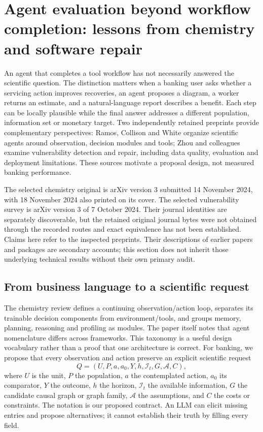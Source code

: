 \section[Agent evaluation beyond workflow completion]{Agent evaluation beyond workflow completion: lessons from chemistry and software repair}
\label{sec:exec25-cow}

An agent that completes a tool workflow has not necessarily answered the scientific question. The distinction matters when a banking user asks whether a servicing action improves recoveries, an agent proposes a diagram, a worker returns an estimate, and a natural-language report describes a benefit. Each step can be locally plausible while the final answer addresses a different population, information set or monetary target. Two independently retained preprints provide complementary perspectives: Ramos, Collison and White organize scientific agents around observation, decision modules and tools; Zhou and colleagues examine vulnerability detection and repair, including data quality, evaluation and deployment limitations. These sources motivate a proposal design, not measured banking performance.\citep{exec25_cow_chemistry,exec25_cow_vulnerability}

The selected chemistry original is arXiv version 3 submitted 14 November 2024, with 18 November 2024 also printed on its cover. The selected vulnerability survey is arXiv version 3 of 7 October 2024. Their journal identities are separately discoverable, but the retained original journal bytes were not obtained through the recorded routes and exact equivalence has not been established. Claims here refer to the inspected preprints. Their descriptions of earlier papers and packages are secondary accounts; this section does not inherit those underlying technical results without their own primary audit.\citep{exec25_cow_chemistry,exec25_cow_vulnerability}

\subsection{From business language to a scientific request}

The chemistry review defines a continuing observation/action loop, separates its trainable decision components from environment/tools, and groups memory, planning, reasoning and profiling as modules. The paper itself notes that agent nomenclature differs across frameworks. This taxonomy is a useful design vocabulary rather than a proof that one architecture is correct. For banking, we propose that every observation and action preserve an explicit scientific request
\[
 Q=(U,P,a,a_0,Y,h,\mathcal I_t,G,\mathcal A,C),
\]
where $U$ is the unit, $P$ the population, $a$ the contemplated action, $a_0$ its comparator, $Y$ the outcome, $h$ the horizon, $\mathcal I_t$ the available information, $G$ the candidate causal graph or graph family, $\mathcal A$ the assumptions, and $C$ the costs or constraints. The notation is our proposed contract. An LLM can elicit missing entries and propose alternatives; it cannot establish their truth by filling every field.\citep{exec25_cow_chemistry,exec25_cow_reference}

